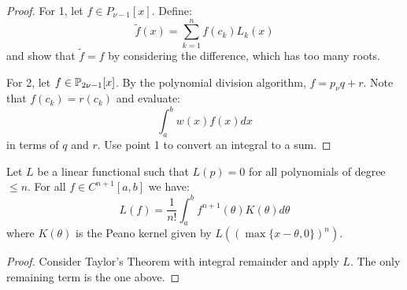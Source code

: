 \documentclass[../Main.tex]{subfiles}
\begin{document}
\begin{proof}
    For 1, let $f \in P_{\nu - 1}[x]$. Define:
    \begin{equation*}
        \tilde{f}(x) = \sum_{k=1}^{n}f(c_k)L_k(x)
    \end{equation*}
    and show that $\tilde{f} = f$ by considering the difference, which has too many roots.

    For 2, let $f \in \P_{2\nu-1}[x]$. By the polynomial division algorithm, $f = p_\nu q + r$. Note that $f(c_k) = r(c_k)$ and evaluate:
    \begin{equation*}
        \int_{a}^{b} w(x)f(x) dx 
    \end{equation*}
    in terms of $q$ and $r$. Use point 1 to convert an integral to a sum.
\end{proof}
\begin{theorem}
    Let $L$ be a linear functional such that $L(p) = 0$ for all polynomials of degree $\leq n$. For all $f \in C^{n+1}[a, b]$ we have:
    \begin{equation*}
        L(f) = \frac1{n!} \int_{a}^{b} f^{n+1}(\theta)K(\theta) d\theta
    \end{equation*}
    where $K(\theta)$ is the Peano kernel given by $L((\max\{x-\theta, 0\})^n)$.
    \label{thmPeanoKernel}
\end{theorem}
\begin{proof}
    Consider Taylor's Theorem with integral remainder and apply $L$. The only remaining term is the one above.
\end{proof}
\end{document}

